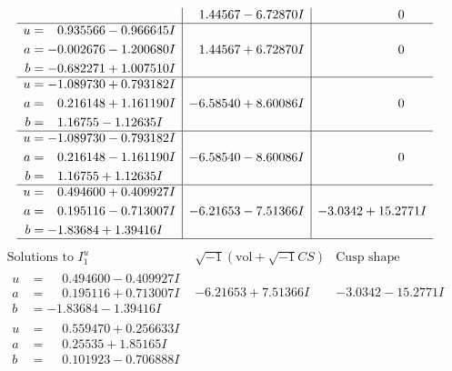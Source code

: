 \documentclass[1p]{elsarticle_modified}
\theoremstyle{definition}
\newcommand{\I}{\sqrt{-1}}
\begin{document}
$$\begin{array}{c|c|c}
 & \phantom{-}1.44567 - 6.72870 I & \phantom{-0.000000 } 0 \\ \hline\begin{aligned}
u &= \phantom{-}0.935566 - 0.966645 I \\
a &= -0.002676 - 1.200680 I \\
b &= -0.682271 + 1.007510 I\end{aligned}
 & \phantom{-}1.44567 + 6.72870 I & \phantom{-0.000000 } 0 \\ \hline\begin{aligned}
u &= -1.089730 + 0.793182 I \\
a &= \phantom{-}0.216148 + 1.161190 I \\
b &= \phantom{-}1.16755 - 1.12635 I\end{aligned}
 & -6.58540 + 8.60086 I & \phantom{-0.000000 } 0 \\ \hline\begin{aligned}
u &= -1.089730 - 0.793182 I \\
a &= \phantom{-}0.216148 - 1.161190 I \\
b &= \phantom{-}1.16755 + 1.12635 I\end{aligned}
 & -6.58540 - 8.60086 I & \phantom{-0.000000 } 0 \\ \hline\begin{aligned}
u &= \phantom{-}0.494600 + 0.409927 I \\
a &= \phantom{-}0.195116 - 0.713007 I \\
b &= -1.83684 + 1.39416 I\end{aligned}
 & -6.21653 - 7.51366 I & -3.0342 + 15.2771 I\\
 \hline 
 \end{array}$$\newpage$$\begin{array}{c|c|c}  
\text{Solutions to }I^u_{1}& \I (\text{vol} + \sqrt{-1}CS) & \text{Cusp shape}\\
 \hline 
\begin{aligned}
u &= \phantom{-}0.494600 - 0.409927 I \\
a &= \phantom{-}0.195116 + 0.713007 I \\
b &= -1.83684 - 1.39416 I\end{aligned}
 & -6.21653 + 7.51366 I & -3.0342 - 15.2771 I \\ \hline\begin{aligned}
u &= \phantom{-}0.559470 + 0.256633 I \\
a &= \phantom{-}0.25535 + 1.85165 I \\
b &= \phantom{-}0.101923 - 0.706888 I\end{aligned}

\end{array}$$
\end{document}
